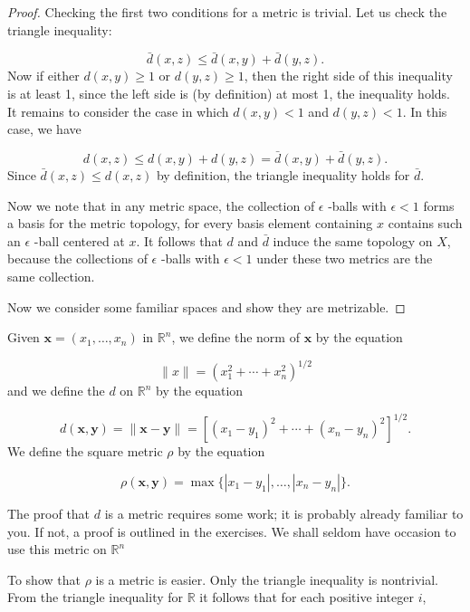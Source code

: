 \begin{proof}
 Checking the first two conditions for a metric is trivial. Let us check the triangle inequality:

 \[
 \bar{d}( {x,z}) \leq \bar{d}( {x,y}) + \bar{d}( {y,z}).
 \]
 Now if either \(d( {x,y}) \geq 1\) or \(d( {y,z}) \geq 1\), then the right side of this inequality is at least 1, since the left side is (by definition) at most 1, the inequality holds. It remains to consider the case in which \(d( {x,y}) < 1\) and \(d( {y,z}) < 1\). In this case, we have

 \[
 d( {x,z}) \leq d( {x,y}) + d( {y,z}) = \bar{d}( {x,y}) + \bar{d}( {y,z}).
 \]
 Since \(\bar{d}( {x,z}) \leq d( {x,z})\) by definition, the triangle inequality holds for \(\bar{d}\).

 Now we note that in any metric space, the collection of \(\epsilon\) -balls with \(\epsilon < 1\) forms a basis for the metric topology, for every basis element containing \(x\) contains such an \(\epsilon\) -ball centered at \(x\). It follows that \(d\) and \(\bar{d}\) induce the same topology on \(X\), because the collections of \(\epsilon\) -balls with \(\epsilon < 1\) under these two metrics are the same collection.

 Now we consider some familiar spaces and show they are metrizable.
\end{proof}

\begin{definition}
 Given \(\mathbf{x} = ( {x_{1},\ldots,x_{n}})\) in \(\mathbb{R}^{n}\), we define the norm of \(\mathbf{x}\) by the equation

 \[
 \parallel x\parallel = {( x_1^{2} + \cdots + x_n^{2}) }^{1/2}
 \]
 and we define the \(d\) on \(\mathbb{R}^{n}\) by the equation

 \[
 d( {\mathbf{x},\mathbf{y}}) = \parallel \mathbf{x} - \mathbf{y}\parallel = {[ {( x_{1} - y_{1}) }^{2} + \cdots + {( x_{n} - y_{n}) }^{2}] }^{1/2}.
 \]
 We define the square metric \(\rho\) by the equation

 \[
 \rho ( {\mathbf{x},\mathbf{y}}) = \max \{ {| {x_{1} - y_{1}}|,\ldots,| {x_{n} - y_{n}}| }\}.
 \]
\end{definition}

The proof that \(d\) is a metric requires some work; it is probably already familiar to you. If not, a proof is outlined in the exercises. We shall seldom have occasion to use this metric on \(\mathbb{R}^{n}\)

To show that \(\rho\) is a metric is easier. Only the triangle inequality is nontrivial. From the triangle inequality for \(\mathbb{R}\) it follows that for each positive integer \(i\),

